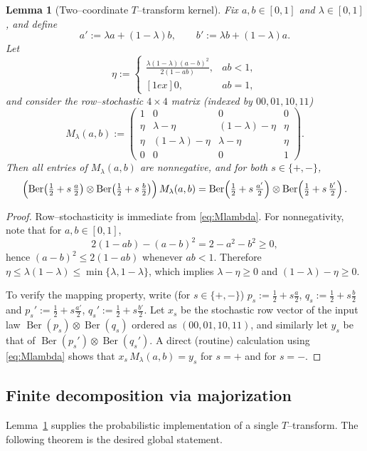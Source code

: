 \documentclass[11pt]{amsart}
\theoremstyle{plain}
\newtheorem{lemma}[theorem]{Lemma}
\theoremstyle{definition}
\DeclareMathOperator{\Ber}{Ber}
\begin{document}
\begin{appendix}
\begin{lemma}[Two--coordinate $T$--transform kernel]
\label{lem:Ttransform-2coord}
Fix $a,b\in[0,1]$ and $\lambda\in[0,1]$, and define
\[
a' := \lambda a + (1-\lambda)b,
\qquad
b' := \lambda b + (1-\lambda)a.
\]
Let
\[
\eta := 
\begin{cases}
\displaystyle \frac{\lambda(1-\lambda)(a-b)^2}{2(1-ab)}, & ab<1,\\
[1ex]
0, & ab=1,
\end{cases}
\]
and consider the row--stochastic $4\times4$ matrix (indexed by $00,01,10,11$)
\begin{equation}
\label{eq:Mlambda}
M_{\lambda}(a,b):=
\left(\begin{array}{cccc}
1 & 0 & 0 & 0 \\
\eta & \lambda-\eta & (1-\lambda)-\eta & \eta \\
\eta & (1-\lambda)-\eta & \lambda-\eta & \eta \\
0 & 0 & 0 & 1 
\end{array}\right).
\end{equation}
Then all entries of $M_{\lambda}(a,b)$ are nonnegative, and for both $s\in\{+,-\}$,
\[
\Bigl(\Ber\!\left(\tfrac12+s\,\tfrac a2\right)\otimes \Ber\!\left(\tfrac12+s\,\tfrac b2\right)\Bigr)\,M_{\lambda}(a,b)
=
\Ber\!\left(\tfrac12+s\,\tfrac {a'}2\right)\otimes \Ber\!\left(\tfrac12+s\,\tfrac {b'}2\right).
\]
\end{lemma}

\begin{proof}
Row--stochasticity is immediate from \eqref{eq:Mlambda}.
For nonnegativity, note that for $a,b\in[0,1]$,
\[
2(1-ab)-(a-b)^2 = 2-a^2-b^2 \ge 0,
\]
hence $(a-b)^2\le 2(1-ab)$ whenever $ab<1$. Therefore
$\eta\le \lambda(1-\lambda)\le \min\{\lambda,1-\lambda\}$, which implies
$\lambda-\eta\ge0$ and $(1-\lambda)-\eta\ge0$.

To verify the mapping property, write (for $s\in\{+,-\}$)
$p_s:=\tfrac12+s\tfrac a2$, $q_s:=\tfrac12+s\tfrac b2$ and
$p_s':=\tfrac12+s\tfrac {a'}2$, $q_s':=\tfrac12+s\tfrac {b'}2$.
Let $x_s$ be the stochastic row vector of the input law
$\Ber(p_s)\otimes\Ber(q_s)$ ordered as $(00,01,10,11)$, and similarly let $y_s$
be that of $\Ber(p_s')\otimes\Ber(q_s')$.
A direct (routine) calculation using \eqref{eq:Mlambda} shows that
$x_s\,M_{\lambda}(a,b)=y_s$ for $s=+$ and for $s=-$. 
\end{proof}

\subsection*{Finite decomposition via majorization}
Lemma~\ref{lem:Ttransform-2coord} supplies the probabilistic implementation
of a single $T$--transform. The following theorem is the desired global statement.


\end{appendix}
\end{document}
